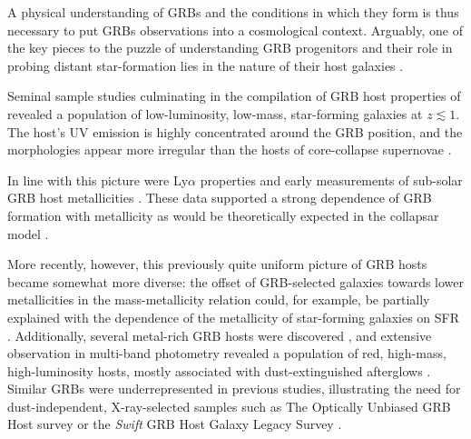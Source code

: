 \documentclass[traditabstract, longauth]{aa}
\begin{document}
A physical understanding of GRBs and the conditions in which they form is thus necessary to put GRBs observations into a cosmological context. Arguably, one of the key pieces to the puzzle of understanding GRB progenitors and their role in probing distant star-formation lies in the nature of their host galaxies \citep[e.g.,][for a review]{2014PASP..126....1L}. 

Seminal sample studies \citep[e.g.,][]{2003A&A...400..499L, 2004A&A...425..913C, 2004MNRAS.352.1073T, 2010AJ....139..694L} culminating in the compilation of GRB host properties of \citet{2009ApJ...691..182S} revealed a population of low-luminosity, low-mass, star-forming galaxies at $z\lesssim1$. The host's UV emission is highly concentrated around the GRB position, and the morphologies appear more irregular than the hosts of core-collapse supernovae \citep{2006Natur.441..463F, 2010MNRAS.405...57S}. 

In line with this picture were Ly$\alpha$ properties \citep{2003A&A...406L..63F, 2012ApJ...756...25M} and early measurements of sub-solar GRB host metallicities \citep[e.g.,][]{2004ApJ...611..200P, 2005A&A...444..711G, 2005NewA...11..103S}. These data supported a strong dependence of GRB formation with metallicity \citep[e.g.,][]{2005A&A...443..581H, 2006A&A...460..199Y} as would be theoretically expected in the collapsar model \citep{1993ApJ...405..273W, 1999ApJ...524..262M}. 

More recently, however, this previously quite uniform picture of GRB hosts became somewhat more diverse: the offset of GRB-selected galaxies towards lower metallicities in the mass-metallicity relation \citep{2010AJ....140.1557L} could, for example, be partially explained with the dependence of the metallicity of star-forming galaxies on SFR \citep[e.g.,][]{2011MNRAS.414.1263M, 2011ApJ...735L...8K}. Additionally, several metal-rich GRB hosts were discovered \citep{2010ApJ...712L..26L, 2013A&A...556A..23E, 2015Patsubm}, and extensive observation in multi-band photometry revealed a population of red, high-mass, high-luminosity hosts, mostly associated with dust-extinguished afterglows \citep{2011A&A...534A.108K, 2012A&A...545A..77R, 2012ApJ...756..187H, 2013ApJ...778..128P}. Similar GRBs were underrepresented in previous studies, illustrating the need for dust-independent, X-ray-selected samples such as The Optically Unbiased GRB Host survey \citep[TOUGH,][]{2012ApJ...756..187H} or the \textit{Swift} GRB Host Galaxy Legacy Survey \citep[SHOALS,][]{2015arXiv150402482P}.
\end{document}
